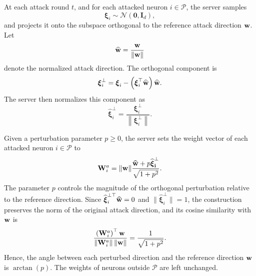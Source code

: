 At each attack round $t$, and for each attacked neuron $i\in\mathcal P$, the
server samples
\begin{equation*}
    \boldsymbol{\xi}_i
    \sim
    \mathcal N(\mathbf 0,\mathbf I_d),
\end{equation*}
and projects it onto the subspace orthogonal to the reference attack direction
$\mathbf{w}$. Let
\begin{equation*}
    \widehat{\mathbf{w}}
    =
    \frac{\mathbf{w}}{\|\mathbf{w}\|}
\end{equation*}
denote the normalized attack direction. The orthogonal component is
\begin{equation*}
    \boldsymbol{\xi}^{\perp}_i
    =
    \boldsymbol{\xi}_i
    -
    \left(
        \boldsymbol{\xi}_i^\top
        \widehat{\mathbf{w}}
    \right)
    \widehat{\mathbf{w}}.
\end{equation*}
The server then normalizes this component as
\begin{equation*}
    \widehat{\boldsymbol{\xi}}^{\perp}_i
    =
    \frac{
         \boldsymbol{\xi}^{\perp}_i
    }{
        \left\|
             \boldsymbol{\xi}^{\perp}_i
        \right\|
    }.
\end{equation*}

Given a perturbation parameter $p\geq 0$, the server sets the weight vector of each attacked neuron $i\in\mathcal P$ to
\begin{equation}
\label{eq:perturbed_direction}
\mathbf{W}_i^{a}
=
\|\mathbf{w}\|
\frac{
\widehat{\mathbf{w}}
+
p \mathbf{\widehat{\boldsymbol{\xi}}^{\perp}_i}
}{
\sqrt{1+p^2}
}.
\end{equation}
The parameter $p$ controls the magnitude of the orthogonal perturbation relative to the reference direction. Since
$\widehat{\boldsymbol{\xi}}^{\perp \top}_i\widehat{\mathbf{w}}=0$ and $\|\widehat{\boldsymbol{\xi}}^{\perp}_i\|=1$, the construction preserves the norm of the original attack direction, and its cosine similarity with $\mathbf{w}$ is
\begin{equation*}
\frac{
\left(\mathbf{W}_i^{a}\right)^\top\mathbf{w}
}{
\left\|\mathbf{W}_i^{a}\right\|
\|\mathbf{w}\|
}
=
\frac{1}{\sqrt{1+p^2}}.
\end{equation*}
Hence, the angle between each perturbed direction and the reference direction $\mathbf{w}$ is $\arctan(p)$. The weights of neurons outside $\mathcal P$ are left unchanged.

